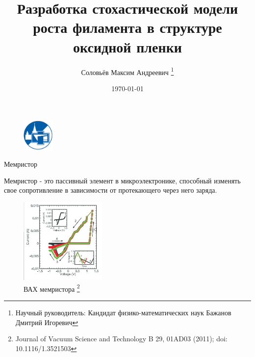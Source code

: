 \documentclass{beamer}%
\begin{document}

\title{Разработка стохастической модели роста филамента в структуре оксидной пленки}
\author{Соловьёв Максим Андреевич \thanks{Научный руководитель: Кандидат физико-математических наук Бажанов Дмитрий Игоревич}}
\date{\today}



\begin{frame}%
\begin{figure}
    \centering
    \includegraphics[width=60px]{img/ff-sign.png}
\end{figure}
\maketitle
\end{frame}

\begin{frame}{Мемристор}
\begin{multicols}{2}
Мемристор - это пассивный элемент в микроэлектронике, способный изменять свое сопротивление в зависимости от протекающего через него заряда. 

\columnbreak
    \begin{figure}
        \centering
        \includegraphics[width=160px]{img/vac_memrister.jpg}
        \caption{ВАХ мемристора%
    \footnote{%
    Journal of Vacuum Science and Technology B 29, 01AD03 (2011); doi: 10.1116/1.3521503
    }%
    }
    \end{figure}
\end {multicols}
\end{frame}
\end{document}

